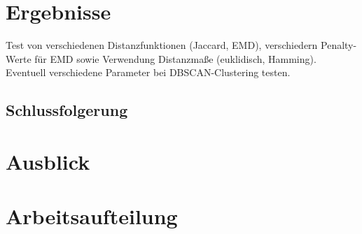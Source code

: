 \documentclass{scrartcl}
\begin{document}
\section{Ergebnisse}
Test von verschiedenen Distanzfunktionen (Jaccard, EMD), verschiedern Penalty-Werte für EMD sowie Verwendung Distanzmaße (euklidisch, Hamming). Eventuell verschiedene Parameter bei DBSCAN-Clustering testen.

\subsection{Schlussfolgerung}

\FloatBarrier

\section{Ausblick}

\section{Arbeitsaufteilung}
\end{document}
